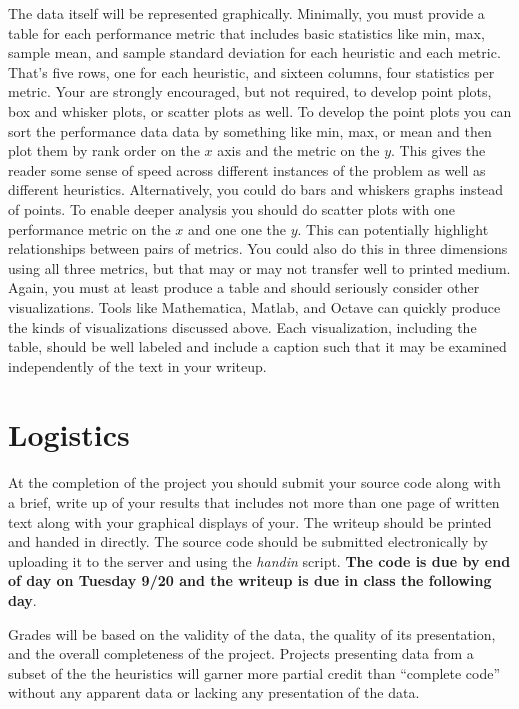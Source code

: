 \documentclass[nobib]{tufte-handout}
\begin{document}
The data itself will be represented graphically. Minimally, you must provide a table for each performance metric that includes basic statistics like min, max, sample mean, and sample standard deviation for each heuristic and each metric. That's five rows, one for each heuristic, and sixteen columns, four statistics per metric. Your are strongly encouraged, but not required, to develop point plots, box and whisker plots, or scatter plots as well. To develop the point plots you can sort the performance data data by something like min, max, or mean and then plot them by rank order on the $x$ axis and the metric on the $y$. This gives the reader some sense of speed across different instances of the problem as well as different heuristics. Alternatively, you could do bars and whiskers graphs instead of points. To enable deeper analysis you should do scatter plots with one performance metric on the $x$ and one one the $y$.  This can potentially highlight relationships between pairs of metrics. You could also do this in three dimensions using all three metrics, but that may or may not transfer well to printed medium.  Again, you must at least produce a table and should seriously consider other visualizations.  Tools like Mathematica, Matlab, and Octave can quickly produce the kinds of visualizations discussed above.  Each visualization, including the table, should be well labeled and include a caption such that it may be examined independently of the text in your writeup.


\section{Logistics}

At the completion of the project you should submit your source code along with a brief, write up of your results that includes not more than one page of written text along with your graphical displays of your.  The writeup should be printed and handed in directly. The source code should be submitted electronically by uploading it to the server and using the \textit{handin} script. \textbf{The code is due by end of day on Tuesday 9/20 and the writeup is due in class the following day}.

Grades will be based on the validity of the data, the quality of its presentation, and the overall completeness of the project. Projects presenting data from a subset of the the heuristics will garner more partial credit than ``complete code'' without any apparent data or lacking any presentation of the data.
\end{document}

